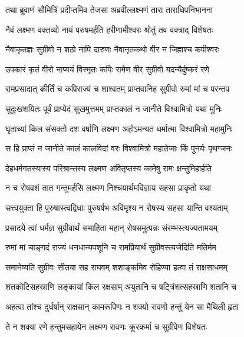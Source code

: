 
\twolineshloka
{तथा ब्रूवाणं सौमित्रिं प्रदीप्तमिव तेजसा}
{अब्रवील्लक्ष्मणं तारा ताराधिपनिभानना} %

\twolineshloka
{नैवं लक्ष्मण वक्तव्यो नायं परुषमर्हति}
{हरीणामीश्वरः श्रोतुं तव वक्त्राद् विशेषतः} %

\twolineshloka
{नैवाकृतज्ञः सुग्रीवो न शठो नापि दारुणः}
{नैवानृतकथो वीर न जिह्मश्च कपीश्वरः} %

\twolineshloka
{उपकारं कृतं वीरो नाप्ययं विस्मृतः कपिः}
{रामेण वीर सुग्रीवो यदन्यैर्दुष्करं रणे} %

\twolineshloka
{रामप्रसादात् कीर्तिं च कपिराज्यं च शाश्वतम्}
{प्राप्तवानिह सुग्रीवो रुमां मां च परन्तप} %

\twolineshloka
{सुदुःखशयितः पूर्वं प्राप्येदं सुखमुत्तमम्}
{प्राप्तकालं न जानीते विश्वामित्रो यथा मुनिः} %

\twolineshloka
{घृताच्यां किल संसक्तो दश वर्षाणि लक्ष्मण}
{अहोऽमन्यत धर्मात्मा विश्वामित्रो महामुनिः} %

\twolineshloka
{स हि प्राप्तं न जानीते कालं कालविदां वरः}
{विश्वामित्रो महातेजाः किं पुनर्यः पृथग्जनः} %

\twolineshloka
{देहधर्मगतस्यास्य परिश्रान्तस्य लक्ष्मण}
{अवितृप्तस्य कामेषु रामः क्षन्तुमिहार्हति} %

\twolineshloka
{न च रोषवशं तात गन्तुमर्हसि लक्ष्मण}
{निश्चयार्थमविज्ञाय सहसा प्राकृतो यथा} %

\twolineshloka
{सत्त्वयुक्ता हि पुरुषास्त्वद्विधाः पुरुषर्षभ}
{अविमृश्य न रोषस्य सहसा यान्ति वश्यताम्} %

\twolineshloka
{प्रसादये त्वां धर्मज्ञ सुग्रीवार्थं समाहिता}
{महान् रोषसमुत्पन्नः संरम्भस्त्यज्यतामयम्} %

\twolineshloka
{रुमां मां चाङ्गदं राज्यं धनधान्यपशूनि च}
{रामप्रियार्थं सुग्रीवस्त्यजेदिति मतिर्मम} %

\twolineshloka
{समानेष्यति सुग्रीवः सीतया सह राघवम्}
{शशाङ्कमिव रोहिण्या हत्वा तं राक्षसाधमम्} %

\twolineshloka
{शतकोटिसहस्राणि लङ्कायां किल रक्षसाम्}
{अयुतानि च षट्त्रिंशत्सहस्राणि शतानि च} %

\twolineshloka
{अहत्वा तांश्च दुर्धर्षान् राक्षसान् कामरूपिणः}
{न शक्यो रावणो हन्तुं येन सा मैथिली हृता} %

\twolineshloka
{ते न शक्या रणे हन्तुमसहायेन लक्ष्मण}
{रावणः क्रूरकर्मा च सुग्रीवेण विशेषतः} %

